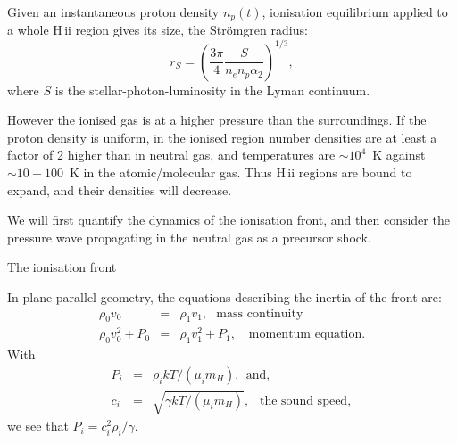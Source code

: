 \begin{frame}{}

Given an instantaneous proton density $n_p(t)$, ionisation equilibrium
applied to a whole H\,{\sc ii} region gives its size, the
Str\"omgren radius:
\begin{equation}
r_S = \left( \frac{3 \pi}{4}  \frac{S}{n_e n_p \alpha_2}
\right)^{1/3}, 
\end{equation}
where $S$ is the stellar-photon-luminosity in the Lyman continuum.

However the ionised gas is at a higher pressure than the
surroundings. If the proton density is uniform, in the ionised region
number densities are at least a factor of 2 higher than in neutral
gas, and temperatures are $\sim 10^4$~K against $\sim 10-100$~K in
the atomic/molecular gas. Thus H\,{\sc ii} regions are bound to
expand, and their densities will decrease. 

We will first quantify the dynamics of the ionisation front, and then
consider the pressure wave propagating in the neutral gas as a
precursor shock. 

\end{frame}






\begin{frame}{The ionisation front}


In plane-parallel geometry, the equations describing the inertia of
the front are:
\begin{eqnarray}
\rho_0 v_0  & = & \rho_1 v_1 , \text{~~mass continuity} \\
\rho_0 v_0^2 + P_0  &    =   & \rho_1 v_1^2 + P_1,  \text{~~ momentum equation}.
\end{eqnarray}
With 
\begin{eqnarray}
P_i &  =  &  \rho_i k T / (\mu_i m_H) , ~~\text{and}, ~\\
c_i  & = & \sqrt{\gamma k T /  (\mu_i m_H) } , ~~\text{ the sound
  speed}, 
\end{eqnarray}
we see that $P_i = c_i^2 \rho_i / \gamma$. 

\end{frame}




